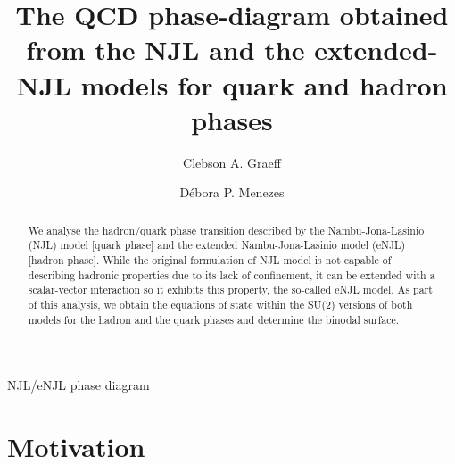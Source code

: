 \documentclass{ws-ijmpcs}
\begin{document}
{NJL/eNJL phase diagram}

%
\catchline{}{}{}{}{}
%

\title{The QCD phase-diagram obtained from the NJL and the extended-NJL models for quark and hadron phases}

\author{Clebson A. Graeff}

\address{Departamento de F\'isica, Universidade Tecnol\'ogica Federal do Paran\'a, Via do Conhecimento, Km 1 CEP 85503-390\\
Pato Branco, Paran\'a,
Brazil
cgraeff@utfpr.ed.br}

\author{D\'ebora P. Menezes}

\address{Departamento de F\'isica, Universidade Federal de Santa Catarina\\ Florian\'opolis, SC, CP 476, CEP 88.040-900, Brazil\\
debora.p.m@ufsc.br}

\maketitle

\begin{history}
\end{history}

\begin{abstract}
We analyse the hadron/quark phase transition described by the Nambu-Jona-Lasinio (NJL) model [quark phase] and the extended Nambu-Jona-Lasinio model (eNJL) [hadron phase]. While the original formulation of NJL model is not capable of describing hadronic properties due to its lack of confinement, it can be extended with a scalar-vector interaction so it exhibits this property, the so-called  eNJL model. As part of this analysis, we obtain the equations of state within the SU(2) versions of both models for the hadron and the quark phases and determine the binodal surface. 
\end{abstract}


\section{Motivation}
\end{document}
